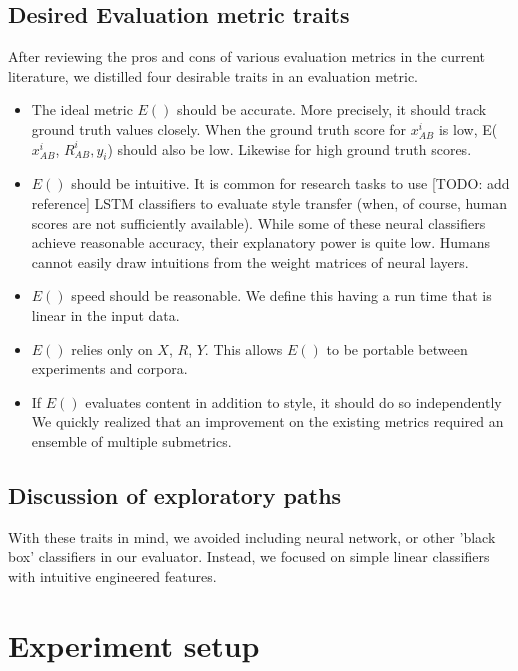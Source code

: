 \documentclass[letterpaper, 10 pt, conference]{ieeeconf}  %
\begin{document}
  \subsection{Desired Evaluation metric traits}
      After reviewing the pros and cons of various evaluation metrics in the current literature, we distilled four desirable traits in an evaluation metric.
    \begin{itemize}

      \item The ideal metric $E()$ should be accurate. More precisely, it should track ground truth values closely. When the ground truth score for $x_{AB}^i$ is low, E($x_{AB}^i$, $R_{AB}^i, y_i$) should also be low. Likewise for high ground truth scores.
      \item $E()$ should be intuitive. It is common for research tasks to use [TODO: add reference] LSTM classifiers to evaluate style transfer (when, of course, human scores are not sufficiently available). While some of these neural classifiers achieve reasonable accuracy, their explanatory power is quite low. Humans cannot easily draw intuitions from the weight matrices of neural layers.
      \item $E()$ speed should be reasonable. We define this having a run time that is linear in the input data.
      \item $E()$ relies only on $X$, $R$, $Y$. This allows $E()$ to be portable between experiments and corpora.
      \item If $E()$ evaluates content in addition to style, it should do so independently
      We quickly realized that an improvement on the existing metrics required an ensemble of multiple submetrics.
    \end{itemize}
  \subsection{Discussion of exploratory paths} 
  With these traits in mind, we avoided including neural network, or other 'black box' classifiers in our evaluator. Instead, we focused on simple linear classifiers with intuitive engineered features. 


\section{Experiment setup}
  
\end{document}

